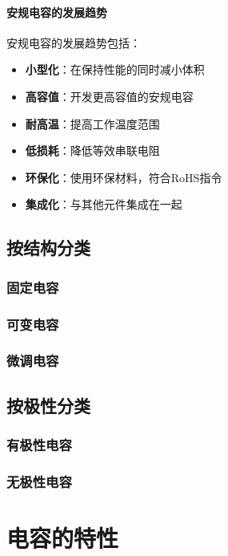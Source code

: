 \documentclass[12pt,UTF8]{ctexbook}
\begin{document}
\subsubsection{安规电容的发展趋势}

安规电容的发展趋势包括：

\begin{itemize}[leftmargin=2cm]
    \item \textbf{小型化}：在保持性能的同时减小体积
    \item \textbf{高容值}：开发更高容值的安规电容
    \item \textbf{耐高温}：提高工作温度范围
    \item \textbf{低损耗}：降低等效串联电阻
    \item \textbf{环保化}：使用环保材料，符合RoHS指令
    \item \textbf{集成化}：与其他元件集成在一起
\end{itemize}

\section{按结构分类}

\subsection{固定电容}

\subsection{可变电容}

\subsection{微调电容}

\section{按极性分类}

\subsection{有极性电容}

\subsection{无极性电容}

\chapter{电容的特性}
\end{document}
